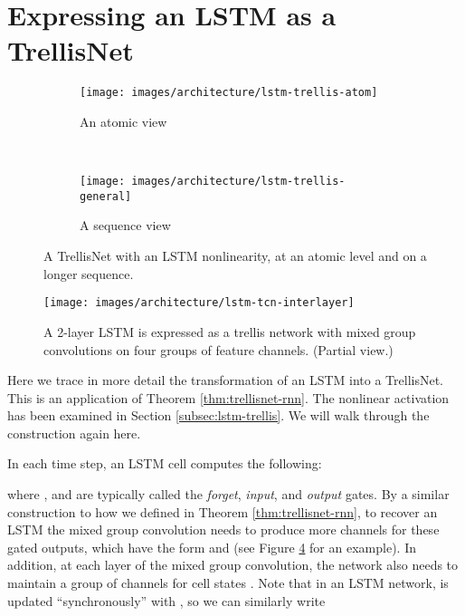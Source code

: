 \documentclass{article} \usepackage{iclr2019_conference,times}
\begin{document}



\newpage

\appendix

\section{Expressing an LSTM as a TrellisNet}
\label{appendix:trellisnet-gated-activation}

\begin{figure}[h]
    \centering
    \begin{subfigure}[b]{.34\textwidth}
        \centering
        \texttt{[image: images/architecture/lstm-trellis-atom]}
        \caption{An atomic view}
        \label{fig:lstm-trellis-atom-appendix}
    \end{subfigure}
    ~
    \begin{subfigure}[b]{.64\textwidth}
        \centering
        \texttt{[image: images/architecture/lstm-trellis-general]}
        \caption{A sequence view}
        \label{fig:lstm-trellis-general}
    \end{subfigure}
    \caption{A TrellisNet with an LSTM nonlinearity, at an atomic level and on a longer sequence.}
    \label{fig:lstm-trellis-network}
\end{figure}

\begin{figure}[b]
    \centering
    \texttt{[image: images/architecture/lstm-tcn-interlayer]}
    \caption{A 2-layer LSTM is expressed as a trellis network with mixed group convolutions on four groups of feature channels. (Partial view.)}
    \label{fig:lstm-tcn-interlayer}
\end{figure}

Here we trace in more detail the transformation of an LSTM into a TrellisNet. This is an application of Theorem \ref{thm:trellisnet-rnn}. The nonlinear activation has been examined in Section \ref{subsec:lstm-trellis}. We will walk through the construction again here.

In each time step, an LSTM cell computes the following:

where , and  are typically called the \emph{forget}, \emph{input}, and \emph{output} gates. By a similar construction to how we defined  in Theorem \ref{thm:trellisnet-rnn}, to recover an LSTM the mixed group convolution needs to produce  more channels for these gated outputs, which have the form  and  (see Figure \ref{fig:lstm-tcn-interlayer} for an example). In addition, at each layer of the mixed group convolution, the network also needs to maintain a group of channels for cell states . Note that in an LSTM network,  is updated ``synchronously'' with , so we can similarly write
\end{document}
